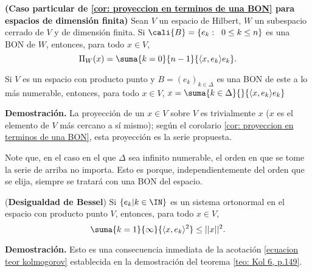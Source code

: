 \begin{cor}
\label{cor: proyeccion en terminos de BON}
\textbf{(Caso particular de \ref{cor: proyeccion en terminos de una BON} para
espacios de dimensión finita)}
Sean $V$ un espacio de Hilbert, $W$ un subespacio cerrado de $V$
y de dimensión finita. Si 
$\cali{B} = \{ e_{k}: \hspace{0.2cm} 0 \leq k \leq n \}$
es una BON de $W$, entonces, para todo $x \in V$,
\[
\Pi_{W}(x) = \suma{k=0}{n-1}{ \langle x, e_{k} \rangle e_{k}}.
\]  
\end{cor}


\begin{cor} \label{cor: representacion de un vector respecto a una BON}
Si $V$ es un espacio con producto punto 
y $B=(e_{k})_{k \in \Delta}$ es una BON de este
a lo más numerable, entonces, para todo
$x \in V$, $x = \suma{k \in \Delta}{}{\langle x, e_{k} \rangle e_{k}}$
\end{cor}
\noindent
\textbf{Demostración.}
La proyección de un $x \in V$ sobre $V$ es trivialmente $x$
($x$ es el elemento de $V$ más cercano a sí mismo); según el corolario
\ref{cor: proyeccion en terminos de una BON}, esta
proyección es la serie propuesta. \QEDB
\vspace{0.2cm}

Note que, en el caso en el que $\Delta$ sea infinito numerable,
el orden en que se tome la serie de arriba no importa. Esto es porque,
independientemente del orden que se elija, siempre se tratará con
una BON del espacio. \\

\begin{cor}(\textbf{Desigualdad de Bessel})
Si $\{ e_{k} | k \in \IN \}$ es un sistema ortonormal en 
el espacio con producto punto $V$, entonces, para todo $x \in V$,
\[
\suma{k=1}{\infty}{\langle x , e_{k} \rangle^{2}} \leq ||x||^{2}.
\]
\end{cor}
\noindent
\textbf{Demostración.}
Esto es una consecuencia inmediata de la acotación
\eqref{ecuacion teor kolmogorov} establecida en la demostración
del teorema \ref{teo: Kol 6, p.149}.
\QEDB
\vspace{0.2cm}




